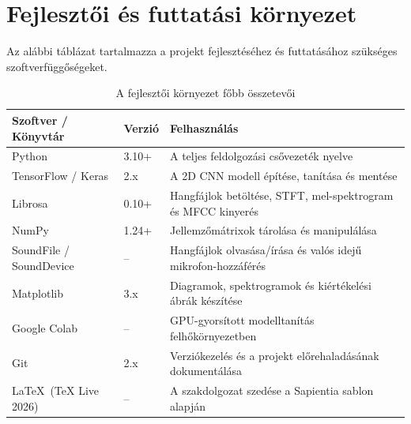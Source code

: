 \section{Fejlesztői és futtatási környezet}
\label{sec:fejlesztoi_kornyezet}

Az alábbi táblázat tartalmazza a projekt fejlesztéséhez és futtatásához szükséges szoftverfüggőségeket.

\begin{table}[H]
\centering
\caption{A fejlesztői környezet főbb összetevői}
\label{tab:fejlesztoi_kornyezet}
\begin{tabular}{p{4.2cm}p{2.5cm}p{7.5cm}}
\toprule
\textbf{Szoftver / Könyvtár} & \textbf{Verzió} & \textbf{Felhasználás} \\
\midrule
Python & 3.10+ & A teljes feldolgozási csővezeték nyelve \\
\addlinespace
TensorFlow / Keras & 2.x & A 2D CNN modell építése, tanítása és mentése \\
\addlinespace
Librosa & 0.10+ & Hangfájlok betöltése, STFT, mel-spektrogram és MFCC kinyerés \\
\addlinespace
NumPy & 1.24+ & Jellemzőmátrixok tárolása és manipulálása \\
\addlinespace
SoundFile / SoundDevice & -- & Hangfájlok olvasása/írása és valós idejű mikrofon-hozzáférés \\
\addlinespace
Matplotlib & 3.x & Diagramok, spektrogramok és kiértékelési ábrák készítése \\
\addlinespace
Google Colab & -- & GPU-gyorsított modelltanítás felhőkörnyezetben \\
\addlinespace
Git & 2.x & Verziókezelés és a projekt előrehaladásának dokumentálása \\
\addlinespace
\LaTeX\ (TeX Live 2026) & -- & A szakdolgozat szedése a Sapientia sablon alapján \\
\bottomrule
\end{tabular}
\end{table}
